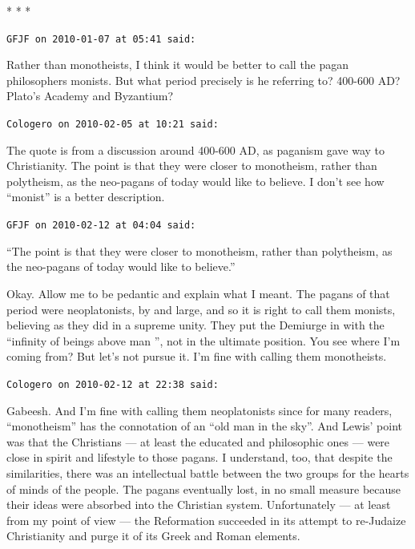 
\begin{center}* * *\end{center}

\begin{footnotesize}
\begin{sffamily}
\texttt{GFJF on 2010-01-07 at 05:41 said:}

Rather than monotheists, I think it would be better to call the pagan philosophers monists. But what period precisely is he referring to? 400-600 AD? Plato's Academy and Byzantium?

\hfill

\texttt{Cologero on 2010-02-05 at 10:21 said:}

The quote is from a discussion around 400-600 AD, as paganism gave way to Christianity. The point is that they were closer to monotheism, rather than polytheism, as the neo-pagans of today would like to believe. I don't see how ``monist'' is a better description.

\hfill

\texttt{GFJF on 2010-02-12 at 04:04 said:}

``The point is that they were closer to monotheism, rather than polytheism, as the neo-pagans of today would like to believe.''

Okay. Allow me to be pedantic and explain what I meant. The pagans of that period were neoplatonists, by and large, and so it is right to call them monists, believing as they did in a supreme unity. They put the Demiurge in with the ``infinity of beings above man '', not in the ultimate position. You see where I'm coming from? But let's not pursue it. I'm fine with calling them monotheists.

\hfill

\texttt{Cologero on 2010-02-12 at 22:38 said:}

Gabeesh. And I'm fine with calling them neoplatonists since for many readers, ``monotheism'' has the connotation of an ``old man in the sky''. And Lewis' point was that the Christians --- at least the educated and philosophic ones --- were close in spirit and lifestyle to those pagans. I understand, too, that despite the similarities, there was an intellectual battle between the two groups for the hearts of minds of the people. The pagans eventually lost, in no small measure because their ideas were absorbed into the Christian system. Unfortunately --- at least from my point of view --- the Reformation succeeded in its attempt to re-Judaize Christianity and purge it of its Greek and Roman elements.


\end{sffamily}
\end{footnotesize}

